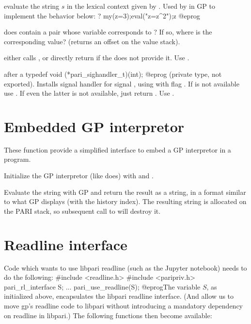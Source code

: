  evaluate the string $s$
in the lexical context given by .  Used by  in GP
to implement the behavior below:
\bprog
? my(z=3);eval("z=z^2");z
@eprog

 does  contain
a pair whose variable corresponds to ? If so, where is the
corresponding value? (returns an offset on the value stack).


 either calls , or directly
return  if the  does not provide it. Use .

 after a
\bprog
  typedef void (*pari_sighandler_t)(int);
@eprog\noindent
(private type, not exported). Installs signal handler  for
signal , using  with flag . If
 is not available use . If even the latter is not
available, just return . Use .

\section{Embedded GP interpretor}
These function provide a simplified interface to embed a GP
interpretor in a program.

Initialize the GP interpretor (like  does) with
 and .

Evaluate the string  with GP and return the result as a string,
in a format similar to what GP displays (with the history index).
The resulting string is allocated on the PARI stack, so subsequent call
to  will destroy it.

\section{Readline interface}

Code which wants to use libpari readline (such as the Jupyter notebook)
needs to do the following:
\bprog
#include <readline.h>
#include <paripriv.h>
pari_rl_interface S;
...
pari_use_readline(S);
@eprog\noindent The variable $S$, as initialized above, encapsulates
the libpari readline interface. (And allow us to move gp's readline code
to libpari without introducing a mandatory dependency on readline in
libpari.) The following functions then become available:

